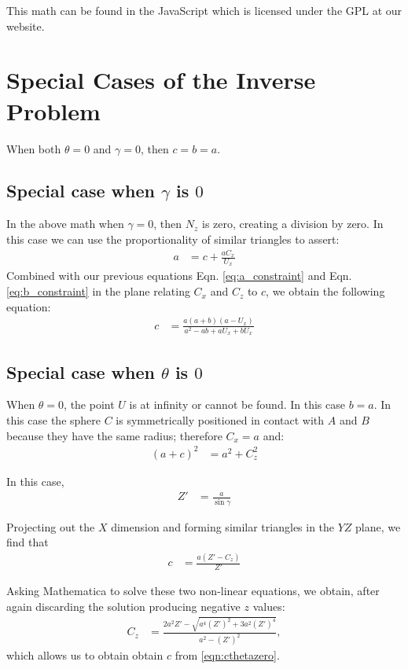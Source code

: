 \documentclass{article}
\begin{document}
This math can be found in the JavaScript which is licensed
under the GPL\cite{german2009empirical} at our website\cite{softrobotcalc}.

\section{Special Cases of the Inverse Problem}

When both $\theta = 0$ and $\gamma = 0$, then $c = b = a$.

\subsection{Special case when $\gamma$ is $0$ }

In the above math when $\gamma = 0$, then $N_z$ is zero,
creating a division by zero.
In this case we can use the proportionality of similar
triangles to assert:
\begin{align}
  a &= c + \frac{a C_x}{U_x}
\end{align}
Combined with our previous equations
Eqn. \ref{eq:a_constraint} and Eqn. \ref{eq:b_constraint} in the plane
relating $C_x$ and $C_z$ to $c$,
we obtain the following equation:
\begin{align}
c & = \frac{a (a + b) (a - U_x)}{a^2 - a b + a U_x + b U_x}
\end{align}


\subsection{Special case when $\theta$ is $0$ }

When $\theta = 0$, the point $U$ is at infinity or
cannot be found. In this case $b = a$.
In this case the sphere $C$ is symmetrically
positioned in contact with $A$ and $B$ because
they have the same radius; therefore $C_x = a$ and:
\begin{align}
(a + c)^2 &= a^2 + C_z^2
\end{align}

In this case,
\begin{align}
Z' &= \frac{a}{\sin{\gamma}}
\end{align}

Projecting out the $X$ dimension and forming
similar triangles in the $YZ$ plane, we find that
\begin{align}
  c &= \frac{a( Z' -C_z )}{Z'} \label{eqn:cthetazero}
\end{align}

Asking Mathematica to solve these two non-linear equations, we obtain,
after again discarding the solution producing negative $z$ values:
\begin{align}
 C_z &=  \frac{2 a^2 Z' - \sqrt{a^4 (Z')^2 + 3 a^2 (Z')^4}}{a^2 - (Z')^2},
\end{align}
which allows us to obtain obtain $c$ from \ref{eqn:cthetazero}.
\end{document}
